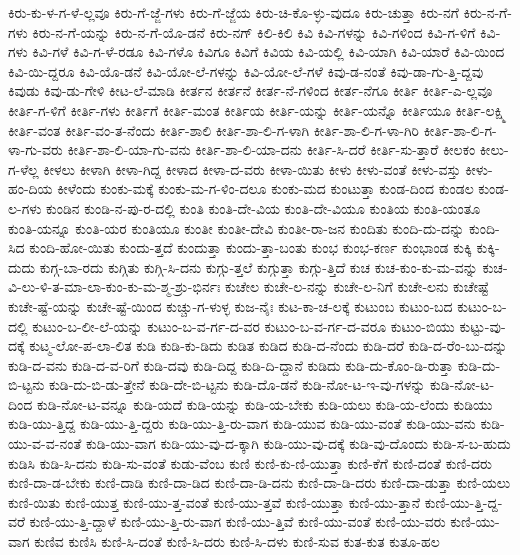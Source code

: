 {ಕಿರು-ಕು-ಳ-ಗ-ಳೆ-ಲ್ಲವೂ
ಕಿರು-ಗೆ-ಜ್ಜೆ-ಗಳು
ಕಿರು-ಗೆ-ಜ್ಜೆಯ
ಕಿರು-ಚಿ-ಕೊ-ಳ್ಳು-ವುದೂ
ಕಿರು-ಚುತ್ತಾ
ಕಿರು-ನಗೆ
ಕಿರು-ನ-ಗೆ-ಗಳು
ಕಿರು-ನ-ಗೆ-ಯನ್ನು
ಕಿರು-ನ-ಗೆ-ಯೊ-ಡನೆ
ಕಿರು-ನಗ್
ಕಿಲಿ-ಕಿಲಿ
ಕಿವಿ
ಕಿವಿ-ಗಳನ್ನು
ಕಿವಿ-ಗಳಿಂದ
ಕಿವಿ-ಗ-ಳಿಗೆ
ಕಿವಿ-ಗಳು
ಕಿವಿ-ಗಳೆ
ಕಿವಿ-ಗ-ಳೆ-ರಡೂ
ಕಿವಿ-ಗಳೊ
ಕಿವಿಗೂ
ಕಿವಿಗೆ
ಕಿವಿಯ
ಕಿವಿ-ಯಲ್ಲಿ
ಕಿವಿ-ಯಾಗಿ
ಕಿವಿ-ಯಾರೆ
ಕಿವಿ-ಯಿಂದ
ಕಿವಿ-ಯಿ-ದ್ದರೂ
ಕಿವಿ-ಯೊ-ಡನೆ
ಕಿವಿ-ಯೋ-ಲೆ-ಗಳನ್ನು
ಕಿವಿ-ಯೋ-ಲೆ-ಗಳೆ
ಕಿವು-ಡ-ನಂತೆ
ಕಿವು-ಡಾ-ಗು-ತ್ತಿ-ದ್ದವು
ಕಿವುಡು
ಕಿವು-ಡು-ಗೇಳಿ
ಕೀಟ-ಲೆ-ಮಾಡಿ
ಕೀರ್ತನ
ಕೀರ್ತನೆ
ಕೀರ್ತ-ನೆ-ಗಳಿಂದ
ಕೀರ್ತ-ನೆಗೂ
ಕೀರ್ತಿ
ಕೀರ್ತಿ-ಎ-ಲ್ಲವೂ
ಕೀರ್ತಿ-ಗ-ಳಿಗೆ
ಕೀರ್ತಿ-ಗಳು
ಕೀರ್ತಿಗೆ
ಕೀರ್ತಿ-ಮಂತ
ಕೀರ್ತಿಯ
ಕೀರ್ತಿ-ಯನ್ನು
ಕೀರ್ತಿ-ಯನ್ನೊ
ಕೀರ್ತಿಯೂ
ಕೀರ್ತಿ-ಲಕ್ಷ್ಮಿ
ಕೀರ್ತಿ-ವಂತ
ಕೀರ್ತಿ-ವಂ-ತ-ನೆಂದು
ಕೀರ್ತಿ-ಶಾಲಿ
ಕೀರ್ತಿ-ಶಾ-ಲಿ-ಗ-ಳಾಗಿ
ಕೀರ್ತಿ-ಶಾ-ಲಿ-ಗ-ಳಾ-ಗಿರಿ
ಕೀರ್ತಿ-ಶಾ-ಲಿ-ಗ-ಳಾ-ಗು-ವರು
ಕೀರ್ತಿ-ಶಾ-ಲಿ-ಯಾ-ಗು-ವನು
ಕೀರ್ತಿ-ಶಾ-ಲಿ-ಯಾ-ದನು
ಕೀರ್ತಿ-ಸಿ-ದರೆ
ಕೀರ್ತಿ-ಸು-ತ್ತಾರೆ
ಕೀಲಕಂ
ಕೀಲು-ಗ-ಳೆಲ್ಲ
ಕೀಳಲು
ಕೀಳಾಗಿ
ಕೀಳಾ-ಗಿದ್ದ
ಕೀಳಾದ
ಕೀಳಾ-ದ-ವರು
ಕೀಳಾ-ಯಿತು
ಕೀಳು
ಕೀಳು-ವಂತೆ
ಕೀಳು-ವಸ್ತು
ಕೀಳು-ಹಂ-ದಿಯ
ಕೀಳೆಂದು
ಕುಂಕು-ಮಕ್ಕೆ
ಕುಂಕು-ಮ-ಗ-ಳಿಂ-ದಲೂ
ಕುಂಕು-ಮದ
ಕುಂಟುತ್ತಾ
ಕುಂಡ-ದಿಂದ
ಕುಂಡಲ
ಕುಂಡ-ಲ-ಗಳು
ಕುಂಡಿನ
ಕುಂಡಿ-ನ-ಪು-ರ-ದಲ್ಲಿ
ಕುಂತಿ
ಕುಂತಿ-ದೇ-ವಿಯ
ಕುಂತಿ-ದೇ-ವಿಯೂ
ಕುಂತಿಯ
ಕುಂತಿ-ಯಂತೂ
ಕುಂತಿ-ಯನ್ನೂ
ಕುಂತಿ-ಯರ
ಕುಂತಿಯೂ
ಕುಂತೀ
ಕುಂತೀ-ದೇವಿ
ಕುಂತೀ-ರಾ-ಜನ
ಕುಂದಿತು
ಕುಂದಿ-ದು-ದನ್ನು
ಕುಂದಿ-ಸಿದ
ಕುಂದಿ-ಹೋ-ಯಿತು
ಕುಂದು-ತ್ತದೆ
ಕುಂದುತ್ತಾ
ಕುಂದು-ತ್ತಾ-ಬಂತು
ಕುಂಭ
ಕುಂಭ-ಕರ್ಣ
ಕುಂಭಾಂಡ
ಕುಕ್ಕಿ
ಕುಕ್ಕಿ-ದುದು
ಕುಗ್ಗ-ಬಾ-ರದು
ಕುಗ್ಗಿತು
ಕುಗ್ಗಿ-ಸಿ-ದನು
ಕುಗ್ಗು-ತ್ತಲೆ
ಕುಗ್ಗುತ್ತಾ
ಕುಗ್ಗು-ತ್ತಿದೆ
ಕುಚ
ಕುಚ-ಕುಂ-ಕು-ಮ-ವನ್ನು
ಕುಚ-ವಿ-ಲು-ಳಿ-ತ-ಮಾ-ಲಾ-ಕುಂ-ಕು-ಮ-ಶ್ಮ-ಶ್ರು-ಭಿರ್ನಃ
ಕುಚೇಲ
ಕುಚೇ-ಲ-ನನ್ನು
ಕುಚೇ-ಲ-ನಿಗೆ
ಕುಚೇ-ಲನು
ಕುಚೇಷ್ಟೆ
ಕುಚೇ-ಷ್ಟೆ-ಯನ್ನು
ಕುಚೇ-ಷ್ಟೆ-ಯಿಂದ
ಕುಚ್ಚು-ಗ-ಳುಳ್ಳ
ಕುಜ-ನೈಃ
ಕುಟ-ಕಾ-ಚ-ಲಕ್ಕೆ
ಕುಟುಂಬ
ಕುಟುಂ-ಬದ
ಕುಟುಂ-ಬ-ದಲ್ಲಿ
ಕುಟುಂ-ಬ-ಲೀ-ಲೆ-ಯನ್ನು
ಕುಟುಂ-ಬ-ವ-ರ್ಗ-ದ-ವರ
ಕುಟುಂ-ಬ-ವ-ರ್ಗ-ದ-ವರೂ
ಕುಟುಂ-ಬಿಯು
ಕುಟ್ಟು-ವು-ದಕ್ಕೆ
ಕುಟ್ಮ-ಲೋ-ಪ-ಲಾ-ಲಿತ
ಕುಡಿ
ಕುಡಿ-ಕು-ಡಿದು
ಕುಡಿತ
ಕುಡಿದ
ಕುಡಿ-ದ-ನೆಂದು
ಕುಡಿ-ದರೆ
ಕುಡಿ-ದ-ರೆಂ-ಬು-ದನ್ನು
ಕುಡಿ-ದ-ವನು
ಕುಡಿ-ದ-ವ-ರಿಗೆ
ಕುಡಿ-ದವು
ಕುಡಿ-ದಿದ್ದ
ಕುಡಿ-ದಿ-ದ್ದಾನೆ
ಕುಡಿದು
ಕುಡಿ-ದು-ಕೊಂ-ಡಿ-ರುತ್ತಾ
ಕುಡಿ-ದು-ಬಿ-ಟ್ಟನು
ಕುಡಿ-ದು-ಬಿ-ಡು-ತ್ತೇನೆ
ಕುಡಿ-ದೇ-ಬಿ-ಟ್ಟನು
ಕುಡಿ-ದೊ-ಡನೆ
ಕುಡಿ-ನೋ-ಟ-ಇ-ವು-ಗಳನ್ನು
ಕುಡಿ-ನೋ-ಟ-ದಿಂದ
ಕುಡಿ-ನೋ-ಟ-ವನ್ನೂ
ಕುಡಿ-ಯದೆ
ಕುಡಿ-ಯನ್ನು
ಕುಡಿ-ಯ-ಬೇಕು
ಕುಡಿ-ಯಲು
ಕುಡಿ-ಯ-ಲೆಂದು
ಕುಡಿಯು
ಕುಡಿ-ಯು-ತ್ತಿದ್ದ
ಕುಡಿ-ಯು-ತ್ತಿ-ದ್ದರು
ಕುಡಿ-ಯು-ತ್ತಿ-ರು-ವಾಗ
ಕುಡಿ-ಯುವ
ಕುಡಿ-ಯು-ವಂತೆ
ಕುಡಿ-ಯು-ವನು
ಕುಡಿ-ಯು-ವ-ವ-ನಂತೆ
ಕುಡಿ-ಯು-ವಾಗ
ಕುಡಿ-ಯು-ವು-ದ-ಕ್ಕಾಗಿ
ಕುಡಿ-ಯು-ವು-ದಕ್ಕೆ
ಕುಡಿ-ವು-ದೊಂದು
ಕುಡಿ-ಸ-ಬ-ಹುದು
ಕುಡಿಸಿ
ಕುಡಿ-ಸಿ-ದನು
ಕುಡಿ-ಸು-ವಂತೆ
ಕುಡು-ವೆಂಬ
ಕುಣಿ
ಕುಣಿ-ಕು-ಣಿ-ಯುತ್ತಾ
ಕುಣಿ-ಕೆಗೆ
ಕುಣಿ-ದಂತೆ
ಕುಣಿ-ದರು
ಕುಣಿ-ದಾ-ಡ-ಬೇಕು
ಕುಣಿ-ದಾಡಿ
ಕುಣಿ-ದಾ-ಡಿದ
ಕುಣಿ-ದಾ-ಡಿ-ದನು
ಕುಣಿ-ದಾ-ಡಿ-ದರು
ಕುಣಿ-ದಾ-ಡುತ್ತಾ
ಕುಣಿ-ಯಲು
ಕುಣಿ-ಯಿತು
ಕುಣಿ-ಯುತ್ತ
ಕುಣಿ-ಯು-ತ್ತ-ವಂತೆ
ಕುಣಿ-ಯು-ತ್ತವೆ
ಕುಣಿ-ಯುತ್ತಾ
ಕುಣಿ-ಯು-ತ್ತಾನೆ
ಕುಣಿ-ಯು-ತ್ತಿ-ದ್ದ-ವರೆ
ಕುಣಿ-ಯು-ತ್ತಿ-ದ್ದಾಳೆ
ಕುಣಿ-ಯು-ತ್ತಿ-ರು-ವಾಗ
ಕುಣಿ-ಯು-ತ್ತಿವೆ
ಕುಣಿ-ಯು-ವಂತೆ
ಕುಣಿ-ಯು-ವರು
ಕುಣಿ-ಯು-ವಾಗ
ಕುಣಿವ
ಕುಣಿಸಿ
ಕುಣಿ-ಸಿ-ದಂತೆ
ಕುಣಿ-ಸಿ-ದರು
ಕುಣಿ-ಸಿ-ದಳು
ಕುಣಿ-ಸುವ
ಕುತ-ಕುತ
ಕುತೂ-ಹಲ
}

